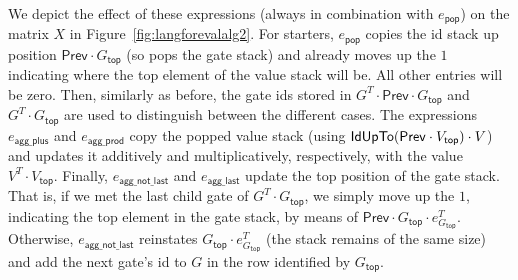 We depict the effect of these expressions (always in combination with $e_{\mathsf{pop}}$) on the matrix $X$ in Figure~\ref{fig:langforevalalg2}.
For starters, $e_{\mathsf{pop}}$ copies the id stack up position $\mathsf{Prev}\cdot G_{\mathsf{top}}$ (so pops
the gate stack) and already moves up the $1$ indicating where the top element of the value stack will be. All other
entries will be zero. Then, similarly as before, the gate ids stored in $G^T\cdot\mathsf{Prev}\cdot G_{\mathsf{top}}$ and $G^T\cdot G_{\mathsf{top}}$ are used to distinguish between the different cases. The expressions $e_{\mathsf{agg\_plus}}$ and $e_{\mathsf{agg\_prod}}$ copy the popped value stack (using $\mathsf{IdUpTo}(\mathsf{Prev}\cdot V_{\mathsf{top}}) \cdot V$) and
updates it additively and multiplicatively, respectively, with the value $V^T \cdot V_{\mathsf{top}}$. Finally, $e_{\mathsf{agg\_not\_last}}$ and $e_{\mathsf{agg\_last}}$ update the top position of the gate stack. That is,
if we met the last child gate of $G^T\cdot G_{\mathsf{top}}$, we simply move up the $1$, indicating the top element in the gate stack, by means of $\mathsf{Prev}\cdot G_{\mathsf{top}} \cdot e_{G_{\mathsf{top}}}^T$. Otherwise, $e_{\mathsf{agg\_not\_last}}$ reinstates $G_{\mathsf{top}}\cdot e_{G_{\mathsf{top}}}^T$ (the stack remains of the same size)
and add the next gate's id to $G$ in the row identified by $G_{\mathsf{top}}$.
   
